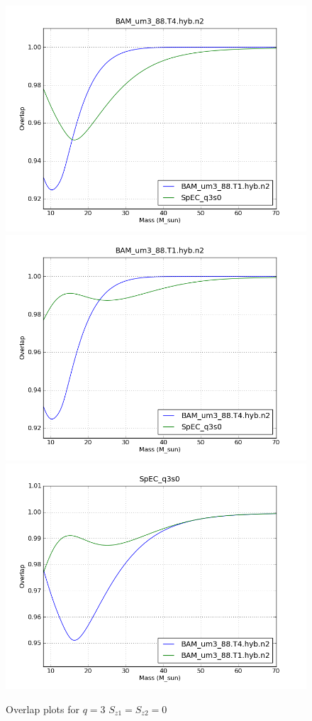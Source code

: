 \begin{figure}
  \includegraphics[width=0.5\linewidth]{figures/ninja2/figure_3_0_02.png} 
  \includegraphics[width=0.5\linewidth]{figures/ninja2/figure_3_0_04.png} \\
  \includegraphics[width=0.5\linewidth]{figures/ninja2/figure_3_0_06.png} 
  \caption[Overlap plots for $q=3$ $S_{z1} = S_{z2} = 0$]{
  \label{f:figure_3_0}
Overlap plots for $q=3$ $S_{z1} = S_{z2} = 0$}
\end{figure}%


